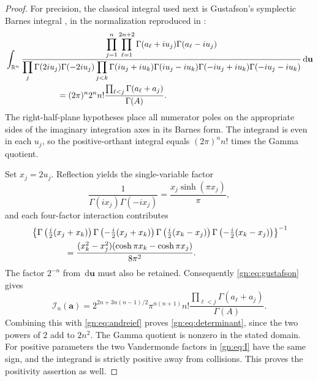\documentclass[11pt,a4paper]{article}
\numberwithin{equation}{section}
\theoremstyle{definition}
\theoremstyle{remark}
\newcommand{\dd}{\,\mathrm d}
\begin{document}
\begin{proof}
For precision, the classical integral used next is Gustafson's
symplectic Barnes integral \cite{gustafson1994}, in the normalization
reproduced in \cite[equation~(2)]{derkachov2017}:
\begin{equation}\label{gn:eq:gustafson}
\begin{split}
 &\int_{\mathbb R^n}
 \frac{\displaystyle\prod_{j=1}^n\prod_{\ell=1}^{2n+2}
                 \Gamma(a_\ell+iu_j)\Gamma(a_\ell-iu_j)}
 {\displaystyle\prod_j\Gamma(2iu_j)\Gamma(-2iu_j)
       \prod_{j<k}\Gamma(iu_j+iu_k)\Gamma(iu_j-iu_k)
                    \Gamma(-iu_j+iu_k)\Gamma(-iu_j-iu_k)}
                  \dd\mathbf u\\
 &\hspace{22mm}=(2\pi)^n2^nn!
       \frac{\prod_{\ell<j}\Gamma(a_\ell+a_j)}{\Gamma(A)}.
\end{split}
\end{equation}
The right-half-plane hypotheses place all numerator poles on the
appropriate sides of the imaginary integration axes in its Barnes
form.  The integrand is even in each $u_j$, so the positive-orthant
integral equals $(2\pi)^nn!$ times the Gamma quotient.

Set $x_j=2u_j$.  Reflection yields the single-variable factor
\begin{equation}\label{gn:eq:single-reflection}
 \frac1{\Gamma(ix_j)\Gamma(-ix_j)}
          =\frac{x_j\sinh(\pi x_j)}\pi,
\end{equation}
and each four-factor interaction contributes
\begin{equation}\label{gn:eq:pair-reflection}
\begin{split}
 &\left\{
 \Gamma\left(\tfrac i2(x_j+x_k)\right)
 \Gamma\left(-\tfrac i2(x_j+x_k)\right)
 \Gamma\left(\tfrac i2(x_k-x_j)\right)
 \Gamma\left(-\tfrac i2(x_k-x_j)\right)
 \right\}^{-1}\\
 &\hspace{14mm}=
 \frac{(x_k^2-x_j^2)(\cosh\pi x_k-\cosh\pi x_j)}{8\pi^2}.
\end{split}
\end{equation}
The factor $2^{-n}$ from $\dd\mathbf u$ must also be retained.
Consequently \eqref{gn:eq:gustafson} gives
\begin{equation}\label{gn:eq:I-evaluation}
 \mathcal I_n(\mathbf a)
 =2^{2n+3n(n-1)/2}\pi^{n(n+1)}n!
       \frac{\prod_{\ell<j}\Gamma(a_\ell+a_j)}{\Gamma(A)}.
\end{equation}
Combining this with \eqref{gn:eq:andreief} proves
\eqref{gn:eq:determinant}, since the two powers of $2$ add to $2n^2$.
The Gamma quotient is nonzero in the stated domain.  For positive
parameters the two Vandermonde factors in \eqref{gn:eq:I} have the same
sign, and the integrand is strictly positive away from collisions.
This proves the positivity assertion as well.
\end{proof}
\end{document}
